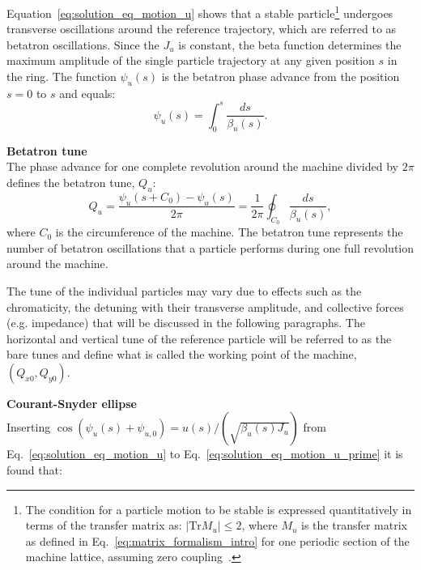 Equation~\eqref{eq:solution_eq_motion_u} shows that a stable particle\footnote{The condition for a particle motion to be stable is expressed quantitatively in terms of the transfer matrix as: $|\mathrm{Tr} M_u| \leq 2$, where $M_u$ is the transfer matrix as defined in Eq.~\eqref{eq:matrix_formalism_intro} for one periodic section of the machine lattice, assuming zero coupling~\cite{wolski2014}.}%
undergoes transverse oscillations around the reference trajectory, which are referred to as betatron oscillations. Since the $J_u$ is constant, the beta function determines the maximum amplitude of the single particle trajectory at any given position $s$ in the ring.
The function $\psi_u(s)$ is the betatron phase advance from the position $s=0$ to $s$ and equals:
\begin{equation}\label{eq:phase_advance_definition_with_twiss}
    \psi_u(s)= \int_{0}^{s} \frac{ds}{\beta_u(s)}.
\end{equation}

\textbf{Betatron tune}\\
The phase advance for one complete revolution around the machine divided by $2\pi$ defines the betatron tune, $Q_u$:
\begin{equation}\label{eq:betatron_tune}
    Q_u = \frac{\psi_u(s+C_0)-\psi_u(s)}{2\pi} = \frac{1}{2\pi} \oint_{C_0} \frac{ds}{\beta_u(s)},
\end{equation}
where $C_0$ is the circumference of the machine. The betatron tune represents the number of betatron oscillations that a particle performs during one full revolution around the machine.

The tune of the individual particles may vary due to effects such as the chromaticity, the detuning with their transverse amplitude, and collective forces (e.g. impedance) that will be discussed in the following paragraphs. The horizontal and vertical tune of the reference particle will be referred to as the bare tunes and define what is called the working point of the machine, $(Q_{x0}, Q_{y0})$. 

\textbf{Courant-Snyder ellipse}\\
Inserting $\cos{(\psi_u(s)+ \psi_{u,0})} = u(s)/(\sqrt{\beta_u(s) J_u})$ from Eq.~\eqref{eq:solution_eq_motion_u} to Eq.~\eqref{eq:solution_eq_motion_u_prime} it is found that:

